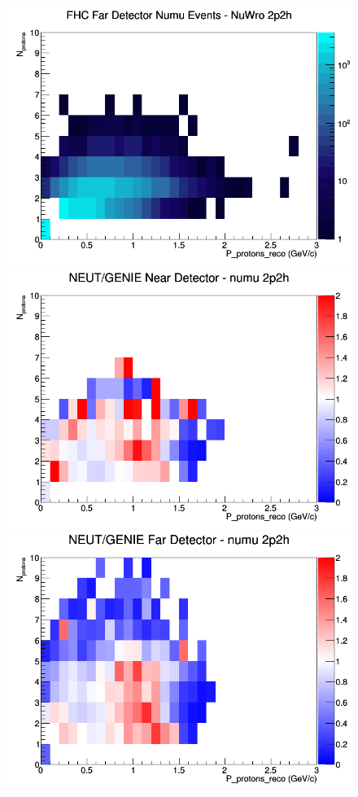 \documentclass[12pt]{article}
\begin{document}
\begin{figure}[h]
\endminipage
{}
\includegraphics[width=\linewidth]{eff_N_P/FGT/protons/2p2h_FHC_FD_numu_N_P_NuWro.png}
\endminipage
\newline
{}
\includegraphics[width=\linewidth]{eff_N_P/FGT/protons/ratios/2p2h_NEUT_GENIE_numu_near_N_P.png}
\endminipage
{}
\includegraphics[width=\linewidth]{eff_N_P/FGT/protons/ratios/2p2h_NEUT_GENIE_numu_far_N_P.png}

\end{figure}
\end{document}
